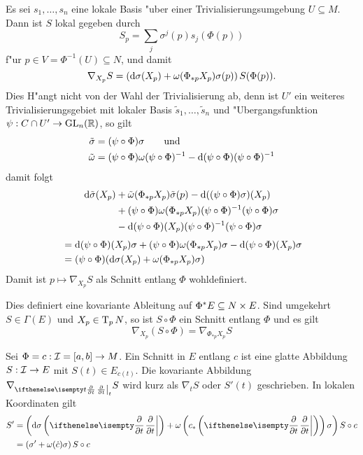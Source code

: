 Es sei $s_1,\ldots ,s_n$ eine lokale Basis "uber einer Trivialisierungsumgebung $U \subseteq M$. Dann ist $S$ lokal gegeben durch
	\[ S_p = \sum_j \sigma^j(p) s_j(\Phi(p)) \]
f"ur $p \in V = \Phi^{-1}(U) \subseteq N$, und damit
	\[ \nabla_{X_p}S = \left( \mathrm{d} \sigma(X_p) + \omega(\Phi_{*p}X_p) \sigma(p) \right) S(\Phi(p)).\]
Dies H"angt nicht von der Wahl der Trivialisierung ab, denn ist $U'$ ein weiteres Trivialisierungsgebiet mit lokaler Basis $\tilde s_1, \ldots , \tilde s_n$ und "Ubergangsfunktion $\psi: C \cap U' \to \operatorname{GL}_n(\operatorname{\mathbb{R}})$, so gilt
\begin{align*}
	\tilde\sigma &= (\psi \circ \Phi) \sigma \qquad \text{und}\\
	\tilde\omega &= (\psi \circ \Phi) \omega(\psi \circ \Phi)^{-1} - \mathrm{d} (\psi \circ \Phi)(\psi \circ \Phi)^{-1}
\end{align*}
damit folgt
\begin{align*}
	\mathrm{d} \tilde\sigma(X_p) &+ \tilde\omega(\Phi_{*p}X_p) \tilde\sigma(p) - \mathrm{d}((\psi \circ \Phi)\sigma) (X_p)\\
	&+ (\psi \circ \Phi) \omega (\Phi_{*p}X_p)(\psi \circ \Phi)^{-1}(\psi \circ \Phi)\sigma\\
	&- \mathrm{d}(\psi \circ \Phi)(X_p)(\psi \circ \Phi)^{-1}(\psi \circ \Phi)\sigma
\end{align*}\begin{align*}
	&= \mathrm{d}(\psi \circ \Phi)(X_p)\sigma + (\psi \circ \Phi)\omega(\Phi_{*p}X_p)\sigma - \mathrm{d}(\psi \circ \Phi)(X_p)\sigma\\
	&= (\psi \circ \Phi)(\mathrm{d}\sigma(X_p) + \omega(\Phi_{*p}X_p)\sigma)
\end{align*}
Damit ist $p \mapsto \nabla_{X_p}S$ als Schnitt entlang $\Phi$ wohldefiniert.
\begin{bem}
Dies definiert eine kovariante Ableitung auf $\Phi^*E \subseteq N \times E$. Sind umgekehrt $S \in \Gamma(E)$ und $X_p \in \operatorname{T}_pN$, so ist $S \circ \Phi$ ein Schnitt entlang $\Phi$ und es gilt
	\[ \nabla_{X_p}(S \circ \Phi) = \nabla_{\Phi_{*p}X_p}S \]
\end{bem}

\begin{emptythm}[Spezialfall:]
Sei $\Phi = c : \operatorname{\mathcal{I}} = [a,b] \to M$. Ein Schnitt in $E$ entlang $c$ ist eine glatte Abbildung $S: \operatorname{\mathcal{I}} \to E$ mit $S(t) \in E_{c(t)}$. Die kovariante Abbildung $\nabla_{\pdifffrac[t]{}{t}} S$ wird kurz als $\nabla_tS$ oder $S'(t)$ geschrieben. In lokalen Koordinaten gilt
\begin{align*}
	S' &= \left( \dop \sigma \left( \pdifffrac{}{t} \right) + \omega\left( c_* \left( \pdifffrac{}{t} \right) \right) \sigma \right) S \circ c\\
	&= \left( \sigma' + \omega(\dot c) \sigma \right) S \circ c
\end{align*}
\end{emptythm}

